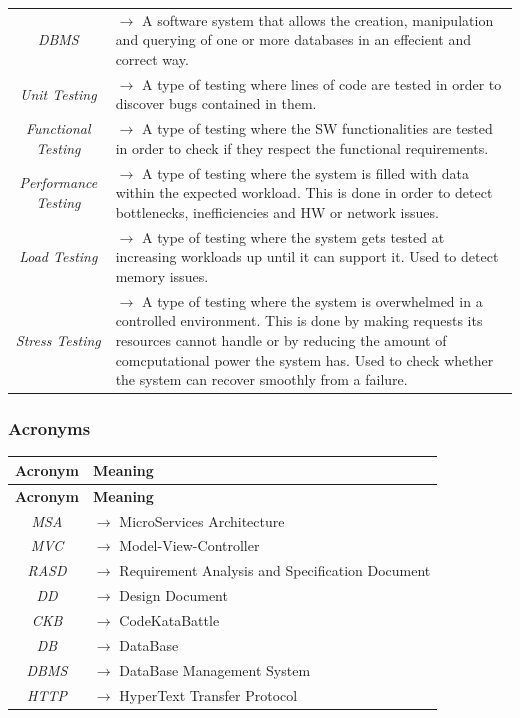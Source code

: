 \documentclass{article}
\begin{document}
{\begin{xltabular}{\textwidth}{ >{\raggedright\arraybackslash}c >{\raggedright\arraybackslash}X }
    \textit{DBMS} & $\rightarrow$ A software system that allows the creation,
    manipulation and querying of one or more databases in an effecient and correct way. \\
    \textit{Unit Testing} & $\rightarrow$ A type of testing where lines of code are tested
    in order to discover bugs contained in them. \\
    \textit{Functional Testing} & $\rightarrow$ A type of testing where the
    SW functionalities are tested in order to check if they respect the functional requirements. \\
    \textit{Performance Testing} & $\rightarrow$ A type of testing where the system is filled with data
    within the expected workload. This is done in order to detect bottlenecks, inefficiencies and HW or network issues. \\
    \textit{Load Testing} & $\rightarrow$ A type of testing where the system gets tested at
    increasing workloads up until it can support it. Used to detect memory issues. \\
    \textit{Stress Testing} & $\rightarrow$ A type of testing where the
    system is overwhelmed in a controlled environment. This is done by making requests its resources cannot handle 
    or by reducing the amount of comcputational power the system has.
    Used to check whether the system can recover smoothly from a failure.
\end{xltabular}

\subsubsection{Acronyms}
\begin{xltabular}{\textwidth}{ >{\raggedright\arraybackslash}c >{\raggedright\arraybackslash}X }
    \hline
    \textbf{Acronym} & \textbf{Meaning} \\
    \hline

    \endfirsthead

    \hline
    \textbf{Acronym} & \textbf{Meaning} \\
    \hline

    \endhead
    \endfoot
    \endlastfoot

    \textit{MSA} & $\rightarrow$ MicroServices Architecture\\
    \textit{MVC} & $\rightarrow$ Model-View-Controller\\
    \textit{RASD} & $\rightarrow$ Requirement Analysis and Specification Document\\
    \textit{DD} & $\rightarrow$ Design Document\\
    \textit{CKB} & $\rightarrow$ CodeKataBattle\\
    \textit{DB} & $\rightarrow$ DataBase \\
    \textit{DBMS} & $\rightarrow$ DataBase Management System \\
    \textit{HTTP} & $\rightarrow$ HyperText Transfer Protocol


\end{xltabular}}
\end{document}
